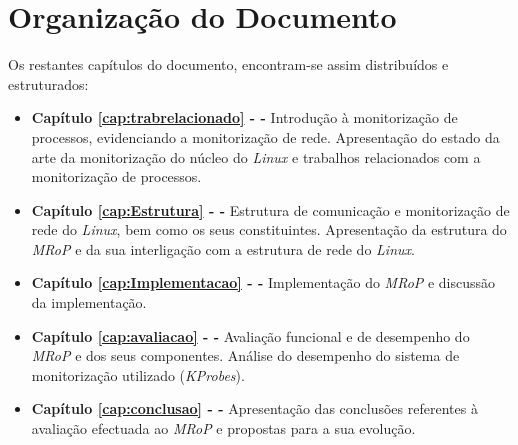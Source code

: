 \bigskip 


\section{Organização do Documento}
\label{sec:intro_document_outline}

Os restantes capítulos do documento, encontram-se assim distribuídos e estruturados:

\begin{itemize}
	\item \textbf{Capítulo \ref{cap:trabrelacionado} -  - } Introdução à monitorização de processos, evidenciando a monitorização de rede. Apresentação do estado da arte da monitorização do núcleo do \textit{Linux} e trabalhos relacionados com a monitorização de processos.

	\item \textbf{Capítulo \ref{cap:Estrutura} -   - } Estrutura de comunicação e monitorização de rede do \textit{Linux}, bem como os seus constituintes. Apresentação da estrutura do \textit{MRoP} e da sua interligação com a estrutura de rede do \textit{Linux}.

	\item \textbf{Capítulo \ref{cap:Implementacao} -  - } Implementação do \textit{MRoP} e discussão da implementação.

	\item \textbf{Capítulo \ref{cap:avaliacao} -  - } Avaliação funcional e de desempenho do \textit{MRoP} e dos seus componentes. Análise do desempenho do sistema de monitorização utilizado (\textit{KProbes}).

	\item \textbf{Capítulo \ref{cap:conclusao} -  - } Apresentação das conclusões referentes à avaliação efectuada ao \textit{MRoP} e propostas para a sua evolução.

\end{itemize}
